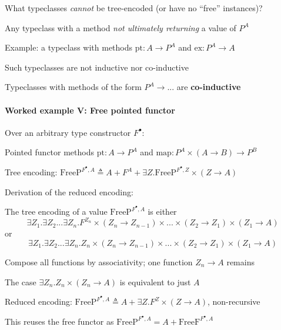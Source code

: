 What typeclasses \emph{cannot} be tree-encoded (or have no \textsf{``}free\textsf{''}
instances)?

Any typeclass with a method \emph{not ultimately returning} a value
of $P^{A}$

Example: a typeclass with methods $\text{pt}:A\rightarrow P^{A}$
and $\text{ex}:P^{A}\rightarrow A$

Such typeclasses are not inductive nor co-inductive

Typeclasses with methods of the form $P^{A}\rightarrow...$ are \textbf{co-inductive}


\paragraph{Worked example V: Free pointed functor}

Over an arbitrary type constructor $F^{\bullet}$:

Pointed functor methods {\footnotesize{}$\text{pt}:A\rightarrow P^{A}$}
and {\footnotesize{}$\text{map}:P^{A}\times\left(A\rightarrow B\right)\rightarrow P^{B}$}{\footnotesize\par}

Tree encoding: {\footnotesize{}$\text{FreeP}^{F^{\bullet},A}\triangleq A+F^{A}+\exists Z.\text{FreeP}^{F^{\bullet},Z}\times\left(Z\rightarrow A\right)$}{\footnotesize\par}

Derivation of the reduced encoding:

The tree encoding of a value $\text{FreeP}^{F^{\bullet},A}$ is either{\footnotesize{}
\[
\exists Z_{1}.\exists Z_{2}...\exists Z_{n}.F^{Z_{n}}\times\left(Z_{n}\rightarrow Z_{n-1}\right)\times...\times\left(Z_{2}\rightarrow Z_{1}\right)\times\left(Z_{1}\rightarrow A\right)
\]
}or{\footnotesize{}
\[
\exists Z_{1}.\exists Z_{2}...\exists Z_{n}.Z_{n}\times\left(Z_{n}\rightarrow Z_{n-1}\right)\times...\times\left(Z_{2}\rightarrow Z_{1}\right)\times\left(Z_{1}\rightarrow A\right)
\]
}{\footnotesize\par}

Compose all functions by associativity; one function $Z_{n}\rightarrow A$
remains

The case $\exists Z_{n}.Z_{n}\times\left(Z_{n}\rightarrow A\right)$
is equivalent to just $A$

Reduced encoding: {\footnotesize{}$\text{FreeP}^{F^{\bullet},A}\triangleq A+\exists Z.F^{Z}\times\left(Z\rightarrow A\right)$,
}non-recursive

This reuses the free functor as $\text{FreeP}^{F^{\bullet},A}=A+\text{FreeF}^{F^{\bullet},A}$


